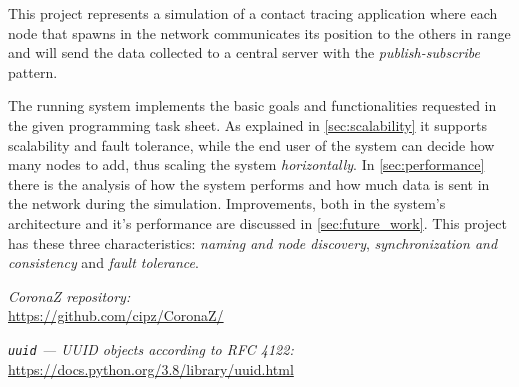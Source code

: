 \documentclass[conference]{IEEEtran}
\begin{document}
	This project represents a simulation of a contact tracing application where each node that spawns in the network communicates its position to the others in range and will send the data collected to a central server with the \textit{publish-subscribe} pattern.
	
	The running system implements the basic goals and functionalities requested in the given programming task sheet.
	As explained in \ref{sec:scalability} it supports scalability and fault tolerance, while the end user of the system can decide how many nodes to add, thus scaling the system \textit{horizontally}.
	In \ref{sec:performance} there is the analysis of how the system performs and how much data is sent in the network during the simulation.
	Improvements, both in the system's architecture and it's performance are discussed in \ref{sec:future_work}.
	This project has these three characteristics: \textit{naming and node discovery}, \textit{synchronization and consistency} and \textit{fault tolerance}.

\begin{thebibliography}{00}
	
		\textit{CoronaZ repository:}\\
		\url{https://github.com/cipz/CoronaZ/}
	
		\textit{\texttt{uuid} — UUID objects according to RFC 4122:}\\
		\url{https://docs.python.org/3.8/library/uuid.html}
		
\end{thebibliography}
\end{document}

